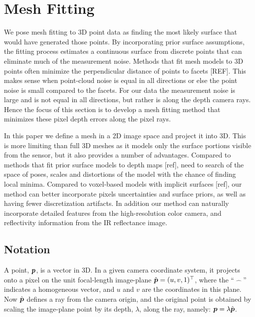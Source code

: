 \section{Mesh Fitting}
\label{sec:fitting}

We pose mesh fitting to 3D point data as finding the most likely surface that would have generated those points.  By incorporating prior surface assumptions, the fitting process estimates a continuous surface from discrete points that can eliminate much of the measurement noise.  Methods that fit mesh models to 3D points often minimize the perpendicular distance of points to facets [REF].  This makes sense when point-cloud noise is equal in all directions or else the point noise is small compared to the facets.  For our data the measurement noise is large and is not equal in all directions, but rather is along the depth camera rays.  Hence the focus of this section is to develop a mesh fitting method that minimizes these pixel depth errors along the pixel rays.

In this paper we define a mesh in a $2$D image space and project it into $3$D.  This is more limiting than full $3$D meshes as it models only the surface portions visible from the sensor, but it also provides a number of advantages.  Compared to methods that fit prior surface models to depth maps [ref], need to search of the space of poses, scales and distortions of the model with the chance of finding local minima.  Compared to voxel-based models with implicit surfaces [ref], our method can better incorporate pixels uncertainties and surface priors, as well as having fewer discretization artifacts.  In addition our method can naturally incorporate detailed features from the high-resolution color camera, and reflectivity information from the IR reflectance image.

\subsection{Notation}

A point, $\boldsymbol{p}$, is a vector in $3$D.  In a given camera coordinate system, it projects onto a pixel on the unit focal-length image-plane $\hat{\boldsymbol{p}}=(u,v,1)^\top$, where the `` $\hat{\text{  }}$ '' indicates a homogeneous vector, and $u$ and $v$ are the coordinates in this plane.  Now $\hat{\boldsymbol{p}}$ defines a ray from the camera origin, and the original point is obtained by scaling the image-plane point by its depth, $\lambda$, along the ray, namely: $\boldsymbol{p} = \lambda\hat{\boldsymbol{p}}$. 

